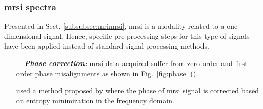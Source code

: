 \subsubsection{\ac{mrsi} spectra}

Presented in Sect. \ref{subsubsec:mrimrsi}, \ac{mrsi} is a modality related to a one dimensional signal. Hence, specific pre-processing steps for this type of signals have been applied instead of standard signal processing methods.

\begin{enumerate}[leftmargin=*]

	\item[$-$] \textbf{\textit{Phase correction:}} \ac{mrsi} data acquired suffer from zero-order and first-order phase misalignments as shown in Fig.~\ref{fig:phase} (\cite{Chen2002,Osorio-Garcia2012}). 
	
\cite{Parfait2012} used a method proposed by \cite{Chen2002} where the phase of \ac{mrsi} signal is corrected based on entropy minimization in the frequency domain.%
%
%
%
%
%
%


\end{enumerate}
